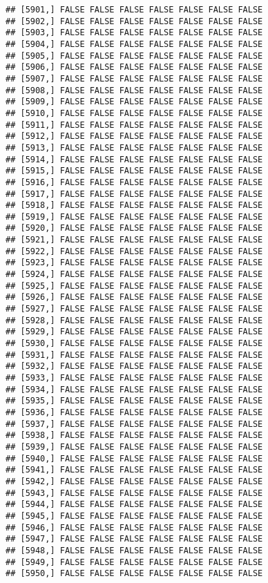 \documentclass[
]{article}
\begin{document}
\begin{verbatim}
## [5901,] FALSE FALSE FALSE FALSE FALSE FALSE FALSE
## [5902,] FALSE FALSE FALSE FALSE FALSE FALSE FALSE
## [5903,] FALSE FALSE FALSE FALSE FALSE FALSE FALSE
## [5904,] FALSE FALSE FALSE FALSE FALSE FALSE FALSE
## [5905,] FALSE FALSE FALSE FALSE FALSE FALSE FALSE
## [5906,] FALSE FALSE FALSE FALSE FALSE FALSE FALSE
## [5907,] FALSE FALSE FALSE FALSE FALSE FALSE FALSE
## [5908,] FALSE FALSE FALSE FALSE FALSE FALSE FALSE
## [5909,] FALSE FALSE FALSE FALSE FALSE FALSE FALSE
## [5910,] FALSE FALSE FALSE FALSE FALSE FALSE FALSE
## [5911,] FALSE FALSE FALSE FALSE FALSE FALSE FALSE
## [5912,] FALSE FALSE FALSE FALSE FALSE FALSE FALSE
## [5913,] FALSE FALSE FALSE FALSE FALSE FALSE FALSE
## [5914,] FALSE FALSE FALSE FALSE FALSE FALSE FALSE
## [5915,] FALSE FALSE FALSE FALSE FALSE FALSE FALSE
## [5916,] FALSE FALSE FALSE FALSE FALSE FALSE FALSE
## [5917,] FALSE FALSE FALSE FALSE FALSE FALSE FALSE
## [5918,] FALSE FALSE FALSE FALSE FALSE FALSE FALSE
## [5919,] FALSE FALSE FALSE FALSE FALSE FALSE FALSE
## [5920,] FALSE FALSE FALSE FALSE FALSE FALSE FALSE
## [5921,] FALSE FALSE FALSE FALSE FALSE FALSE FALSE
## [5922,] FALSE FALSE FALSE FALSE FALSE FALSE FALSE
## [5923,] FALSE FALSE FALSE FALSE FALSE FALSE FALSE
## [5924,] FALSE FALSE FALSE FALSE FALSE FALSE FALSE
## [5925,] FALSE FALSE FALSE FALSE FALSE FALSE FALSE
## [5926,] FALSE FALSE FALSE FALSE FALSE FALSE FALSE
## [5927,] FALSE FALSE FALSE FALSE FALSE FALSE FALSE
## [5928,] FALSE FALSE FALSE FALSE FALSE FALSE FALSE
## [5929,] FALSE FALSE FALSE FALSE FALSE FALSE FALSE
## [5930,] FALSE FALSE FALSE FALSE FALSE FALSE FALSE
## [5931,] FALSE FALSE FALSE FALSE FALSE FALSE FALSE
## [5932,] FALSE FALSE FALSE FALSE FALSE FALSE FALSE
## [5933,] FALSE FALSE FALSE FALSE FALSE FALSE FALSE
## [5934,] FALSE FALSE FALSE FALSE FALSE FALSE FALSE
## [5935,] FALSE FALSE FALSE FALSE FALSE FALSE FALSE
## [5936,] FALSE FALSE FALSE FALSE FALSE FALSE FALSE
## [5937,] FALSE FALSE FALSE FALSE FALSE FALSE FALSE
## [5938,] FALSE FALSE FALSE FALSE FALSE FALSE FALSE
## [5939,] FALSE FALSE FALSE FALSE FALSE FALSE FALSE
## [5940,] FALSE FALSE FALSE FALSE FALSE FALSE FALSE
## [5941,] FALSE FALSE FALSE FALSE FALSE FALSE FALSE
## [5942,] FALSE FALSE FALSE FALSE FALSE FALSE FALSE
## [5943,] FALSE FALSE FALSE FALSE FALSE FALSE FALSE
## [5944,] FALSE FALSE FALSE FALSE FALSE FALSE FALSE
## [5945,] FALSE FALSE FALSE FALSE FALSE FALSE FALSE
## [5946,] FALSE FALSE FALSE FALSE FALSE FALSE FALSE
## [5947,] FALSE FALSE FALSE FALSE FALSE FALSE FALSE
## [5948,] FALSE FALSE FALSE FALSE FALSE FALSE FALSE
## [5949,] FALSE FALSE FALSE FALSE FALSE FALSE FALSE
## [5950,] FALSE FALSE FALSE FALSE FALSE FALSE FALSE

\end{verbatim}
\end{document}
